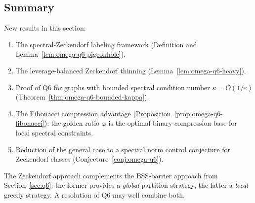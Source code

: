 \subsection{Summary}

New results in this section:
\begin{enumerate}[nosep]
\item The spectral-Zeckendorf labeling framework
  (Definition and Lemma~\ref{lem:omega-q6-pigeonhole}).
\item The leverage-balanced Zeckendorf thinning
  (Lemma~\ref{lem:omega-q6-heavy}).
\item Proof of Q6 for graphs with bounded spectral condition
  number $\kappa=O(1/\varepsilon)$
  (Theorem~\ref{thm:omega-q6-bounded-kappa}).
\item The Fibonacci compression advantage
  (Proposition~\ref{prop:omega-q6-fibonacci}): the golden ratio
  $\varphi$ is the optimal binary compression base for local
  spectral constraints.
\item Reduction of the general case to a spectral norm control
  conjecture for Zeckendorf classes
  (Conjecture~\ref{conj:omega-q6}).
\end{enumerate}

The Zeckendorf approach complements the BSS-barrier approach
from Section~\ref{sec:q6}: the former provides a \emph{global}
partition strategy, the latter a \emph{local} greedy strategy.
A resolution of Q6 may well combine both.
